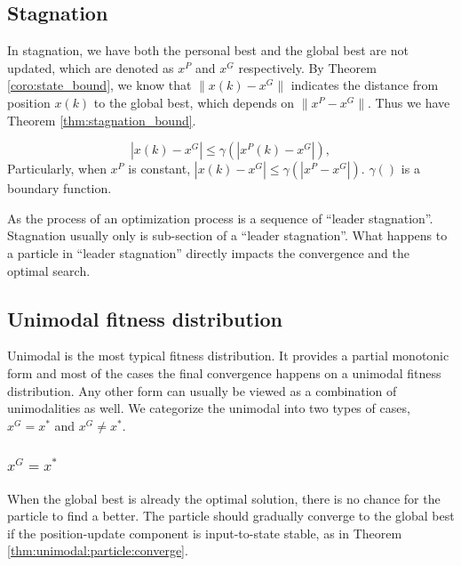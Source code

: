 \subsection{Stagnation}

In stagnation, we have both the personal best and the global best are not updated, which are denoted as $ x^{P} $ and $ x^{G} $ respectively.
By Theorem \ref{coro:state_bound}, we know that $ \lVert x(k) - x^{G} \rVert $ indicates the distance from position $ x(k) $ to the global best, which depends on  $ \lVert x^{P} - x^{G} \rVert $.
Thus we have Theorem \ref{thm:stagnation_bound}.

\begin{mythm}
\label{thm:stagnation_bound}
\begin{equation}
\label{eq:stagnation_bound}
| x(k) - x^{G} | \leq \gamma ( | x^{P}(k) - x^{G} | ), 
\end{equation}
Particularly, when $ x^{P} $ is constant,
$  | x(k) - x^{G} | \leq \gamma ( | x^{P} - x^{G} | ). $
$ \gamma () $ is a boundary function.
\end{mythm}

As the process of an optimization process is a sequence of ``leader stagnation''.
Stagnation usually only is sub-section of a ``leader stagnation''.
What happens to a particle in ``leader stagnation'' directly impacts the convergence and the optimal search.

\subsection{Unimodal fitness distribution}

Unimodal is the most typical fitness distribution.
It provides a partial monotonic form and most of the cases the final convergence happens on a unimodal fitness distribution.
Any other form can usually be viewed as a combination of unimodalities as well.
We categorize the unimodal into two types of cases, $ x^{G} = x^{*} $ and $ x^{G} \not = x^{*} $.

\subsubsection{$ x^{G} = x^{*} $}

When the global best is already the optimal solution, there is no chance for the particle to find a better.
The particle should gradually converge to the global best if the position-update component is input-to-state stable, as in Theorem \ref{thm:unimodal:particle:converge}.

